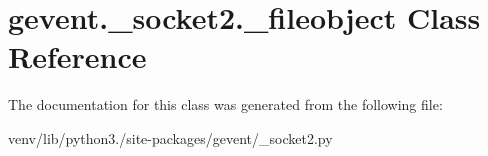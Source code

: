 \hypertarget{classgevent_1_1__socket2_1_1__fileobject}{}\section{gevent.\+\_\+socket2.\+\_\+fileobject Class Reference}
\label{classgevent_1_1__socket2_1_1__fileobject}


The documentation for this class was generated from the following file\+:\begin{DoxyCompactItemize}
\item 
venv/lib/python3./site-\/packages/gevent/\+\_\+socket2.\+py\end{DoxyCompactItemize}
